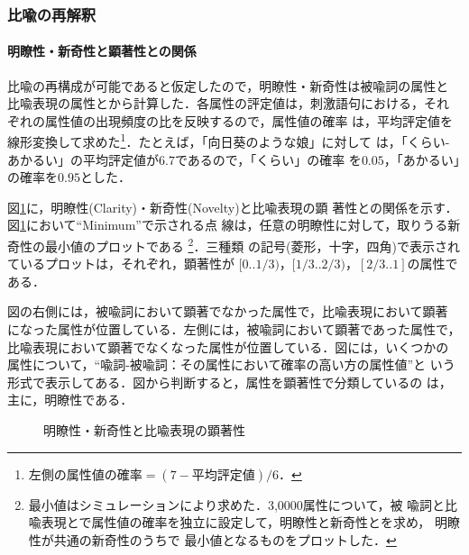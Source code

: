 \vspace{-0.4mm}
\subsubsection{比喩の再解釈}

\paragraph{明瞭性・新奇性と顕著性との関係}
比喩の再構成が可能であると仮定したので，明瞭性・新奇性は被喩詞の属性と
比喩表現の属性とから計算した．各属性の評定値は，刺激語句における，それ
ぞれの属性値の出現頻度の比を反映する\cite{Charles57}ので，属性値の確率
は，平均評定値を線形変換して求めた\footnote{$\mbox{左側の属性値の確率}
= (7-\mbox{平均評定値})/6$．}．たとえば，「向日葵のような娘」に対して
は，「くらい-あかるい」の平均評定値が$6.7$であるので，「くらい」の確率
を$0.05$，「あかるい」の確率を$0.95$とした．

図\ref{fig:charnum}に，明瞭性(Clarity)・新奇性(Novelty)と比喩表現の顕
著性との関係を示す．図\ref{fig:charnum}において``Minimum''で示される点
線は，任意の明瞭性に対して，取りうる新奇性の最小値のプロットである
\footnote{最小値はシミュレーションにより求めた．3,0000属性について，被
喩詞と比喩表現とで属性値の確率を独立に設定して，明瞭性と新奇性とを求め，
明瞭性が共通の新奇性のうちで 最小値となるものをプロットした．}．三種類
の記号(菱形，十字，四角)で表示されているプロットは，それぞれ，顕著性が
$[0..1/3)$，$[1/3..2/3)$，$[2/3..1]$の属性である．

図の右側には，被喩詞において顕著でなかった属性で，比喩表現において顕著
になった属性が位置している．左側には，被喩詞において顕著であった属性で，
比喩表現において顕著でなくなった属性が位置している．図には，いくつかの
属性について，``喩詞-被喩詞：その属性において確率の高い方の属性値''と
いう形式で表示してある．図から判断すると，属性を顕著性で分類しているの
は，主に，明瞭性である．

\begin{figure}[htbp]
  \begin{center}
    
  \end{center}
  \caption{明瞭性・新奇性と比喩表現の顕著性}
  \label{fig:charnum}
\end{figure}

